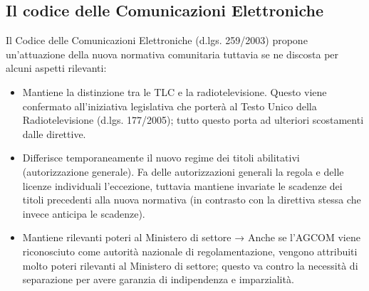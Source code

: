\subsection{Il codice delle Comunicazioni Elettroniche}

Il Codice delle Comunicazioni Elettroniche (d.lgs. 259/2003) propone un’attuazione della nuova normativa
comunitaria tuttavia se ne discosta per alcuni aspetti rilevanti:
\begin{itemize}
    \item Mantiene la distinzione tra le TLC e la radiotelevisione. Questo viene confermato all’iniziativa legislativa che porterà al Testo Unico della Radiotelevisione (d.lgs. 177/2005); tutto questo porta ad ulteriori scostamenti dalle direttive.
    \item Differisce temporaneamente il nuovo regime dei titoli abilitativi (autorizzazione generale). Fa delle autorizzazioni generali la regola e delle licenze individuali l’eccezione, tuttavia mantiene invariate le scadenze dei titoli precedenti alla nuova normativa (in contrasto con la direttiva stessa che invece anticipa le scadenze).
    \item Mantiene rilevanti poteri al Ministero di settore → Anche se l’AGCOM viene riconosciuto come autorità nazionale di regolamentazione, vengono attribuiti molto poteri rilevanti al Ministero di settore; questo va contro la necessità di separazione per avere garanzia di indipendenza e imparzialità.
\end{itemize}

